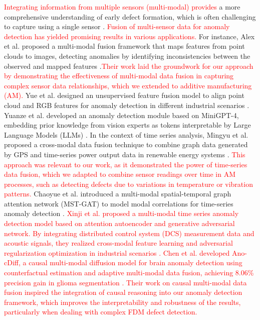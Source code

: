 \documentclass[preprint,12pt]{elsarticle}
\begin{document}
\textcolor{red}{Integrating information from multiple sensors (multi-modal) provides} a more comprehensive understanding of early defect formation, which is often challenging to capture using a single sensor \cite{RN332}. \textcolor{red}{Fusion of multi-sensor data for anomaly detection has yielded promising results in various applications.} For instance, Alex et al. proposed a multi-modal fusion framework that maps features from point clouds to images, detecting anomalies by identifying inconsistencies between the observed and mapped features \cite{RN334}.\textcolor{red}{Their work laid the groundwork for our approach by demonstrating the effectiveness of multi-modal data fusion in capturing complex sensor data relationships, which we extended to additive manufacturing (AM).} Yue et al. designed an unsupervised feature fusion model to align point cloud and RGB features for anomaly detection in different industrial scenarios \cite{RN335}. Yuanze et al. developed an anomaly detection module based on MiniGPT-4, embedding prior knowledge from vision experts as tokens interpretable by Large Language Models (LLMs) \cite{RN338}. In the context of time series analysis, Mingyu et al. proposed a cross-modal data fusion technique to combine graph data generated by GPS and time-series power output data in renewable energy systems \cite{RN336}. \textcolor{red}{This approach was relevant to our work, as it demonstrated the power of time-series data fusion, which we adapted to combine sensor readings over time in AM processes, such as detecting defects due to variations in temperature or vibration patterns.} Chaoyue et al. introduced a multi-modal spatial-temporal graph attention network (MST-GAT) to model modal correlations for time-series anomaly detection \cite{RN337}. \textcolor{red}{Xinji et al. proposed a multi-modal time series anomaly detection model based on attention autoencoder and generative adversarial network. By integrating distributed control system (DCS) measurement data and acoustic signals, they realized cross-modal feature learning and adversarial regularization optimization in industrial scenarios \cite{ad1}. Chen et al. developed Ano-cDiff, a causal multi-modal diffusion model for brain anomaly detection using counterfactual estimation and adaptive multi-modal data fusion, achieving 8.06\% precision gain in glioma segmentation \cite{ad2}. Their work on causal multi-modal data fusion inspired the integration of causal reasoning into our anomaly detection framework, which improves the interpretability and robustness of the results, particularly when dealing with complex FDM defect detection.}
\end{document}
